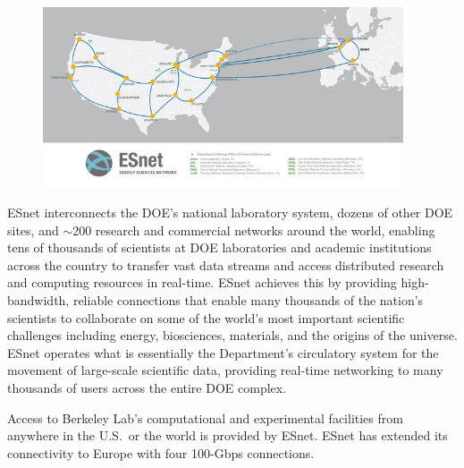 
\begin{figure}[ht]
  \begin{center}
    \includegraphics[width=0.95\textwidth]
    {images/esnet.jpeg}
  \end{center}
\end{figure}

ESnet interconnects the DOE's national laboratory system, dozens
of other DOE sites, and $\sim$200 research and commercial networks around
the world, enabling tens of thousands of scientists at DOE laboratories
and academic institutions across the country to transfer vast data
streams and access distributed research and computing resources in
real-time. ESnet achieves this by providing high-bandwidth, reliable
connections that enable many thousands of the nation's scientists
to collaborate on some of the world's most important scientific
challenges including energy, biosciences, materials, and the origins
of the universe. ESnet operates what is essentially the Department's
circulatory system for the movement of large-scale scientific data,
providing real-time networking to many thousands of users across
the entire DOE complex.

Access to Berkeley Lab's computational and experimental facilities
from anywhere in the U.S.~or the world is provided by ESnet. ESnet
has extended its connectivity to Europe with four 100-Gbps connections.



